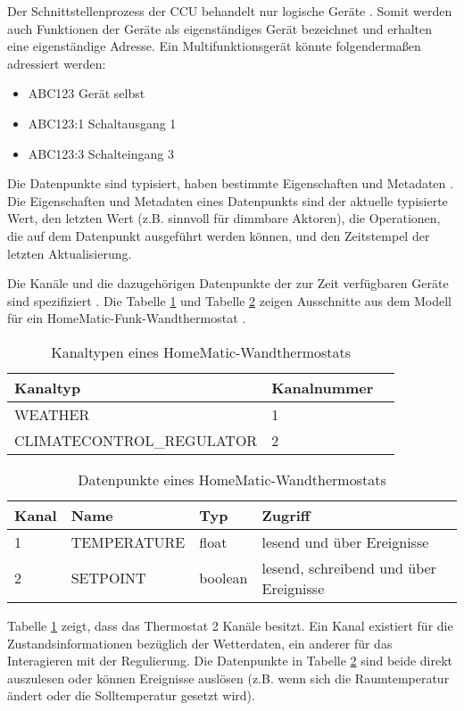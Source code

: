 Der Schnittstellenprozess der CCU behandelt nur logische Geräte \cite{homematic_xmlrpc}.
Somit werden auch Funktionen der Geräte als eigenständiges Gerät bezeichnet und
erhalten eine eigenständige Adresse.
Ein Multifunktionsgerät könnte folgendermaßen adressiert werden:
\begin{itemize}
\item ABC123 Gerät selbst
\item ABC123:1 Schaltausgang 1
\item ABC123:3 Schalteingang 3
\end{itemize}

Die Datenpunkte sind typisiert, haben bestimmte Eigenschaften und Metadaten \cite[Seite 21]{hmscript2}.
Die Eigenschaften und Metadaten eines Datenpunkts sind der aktuelle typisierte Wert, den letzten Wert
(z.B. sinnvoll für dimmbare Aktoren), die Operationen, die auf dem Datenpunkt ausgeführt werden können,
und den Zeitstempel der letzten Aktualisierung.

Die Kanäle und die dazugehörigen Datenpunkte der zur Zeit verfügbaren Geräte sind
spezifiziert \cite{hmscript4}.
Die Tabelle \ref{tab_hm_chan} und Tabelle \ref{tab_hm_dp} zeigen Ausschnitte aus dem Modell für ein
HomeMatic-Funk-Wandthermostat \cite[Seite 12]{hmscript4}.

\begin{table}[h]
\begin{tabular}{|l|l|l|}
\hline
Kanaltyp & Kanalnummer \\
\hline
WEATHER & 1 \\
\hline
CLIMATECONTROL\_REGULATOR & 2 \\
\hline
\end{tabular}
\caption{Kanaltypen eines HomeMatic-Wandthermostats}
\label{tab_hm_chan}
\end{table}

\begin{table}[h]
\begin{tabular}{|l|l|l|l|}
\hline
Kanal & Name & Typ & Zugriff \\
\hline
1 & TEMPERATURE & float & lesend und über Ereignisse \\
\hline
2 & SETPOINT & boolean & lesend, schreibend und über Ereignisse \\
\hline
\end{tabular}
\caption{Datenpunkte eines HomeMatic-Wandthermostats}
\label{tab_hm_dp}
\end{table}

Tabelle \ref{tab_hm_chan} zeigt, dass das Thermostat 2 Kanäle besitzt.
Ein Kanal existiert für die Zustandsinformationen bezüglich der Wetterdaten, ein anderer
für das Interagieren mit der Regulierung.
Die Datenpunkte in Tabelle \ref{tab_hm_dp} sind beide direkt auszulesen oder können
Ereignisse auslösen (z.B. wenn sich die Raumtemperatur ändert oder die Solltemperatur
gesetzt wird).

